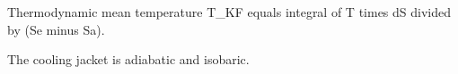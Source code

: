 Thermodynamic mean temperature T_KF equals integral of T times dS divided by (Se minus Sa).  

The cooling jacket is adiabatic and isobaric.